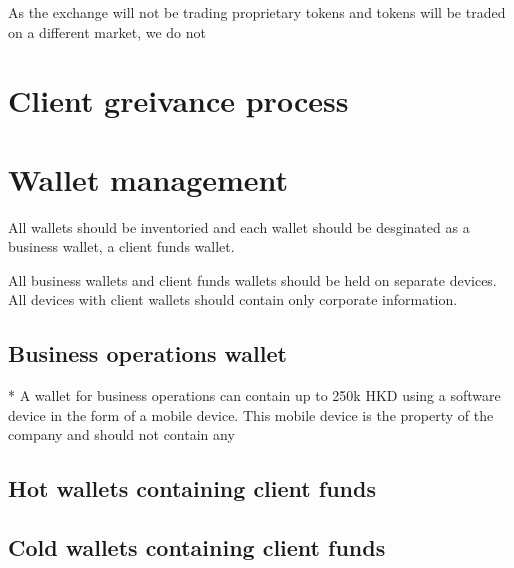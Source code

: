 As the exchange will not be trading proprietary tokens and tokens will
be traded on a different market, we do not 

\section{Client greivance process}

\section{Wallet management}
All wallets should be inventoried and each wallet should be desginated
as a business wallet, a client funds wallet.

All business wallets and client funds wallets should be held on
separate devices.  All devices with client wallets should contain only
corporate information.

\subsection{Business operations wallet}

* A wallet for business operations can contain up to 250k HKD using a
software device in the form of a mobile device.  This mobile device is
the property of the company and should not contain any


\subsection{Hot wallets containing client funds}

\subsection{Cold wallets containing client funds}


